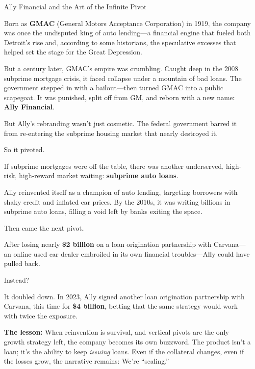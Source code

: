 \begin{HistoricalSidebar}{Ally Financial and the Art of the Infinite Pivot}

  Born as \textbf{GMAC} (General Motors Acceptance Corporation) in 1919, the company was once the undisputed king of 
  auto lending—a financial engine that fueled both Detroit’s rise and, according to some historians, the speculative 
  excesses that helped set the stage for the Great Depression.

  \medskip
  
  But a century later, GMAC’s empire was crumbling. Caught deep in the 2008 subprime mortgage crisis, it faced collapse 
  under a mountain of bad loans. The government stepped in with a bailout—then turned GMAC into a public scapegoat. 
  It was punished, split off from GM, and reborn with a new name: \textbf{Ally Financial}.
  
  \medskip
  
  But Ally’s rebranding wasn’t just cosmetic. The federal government barred it from re-entering the subprime housing 
  market that nearly destroyed it.

  \medskip
  
  So it pivoted.

  \medskip
  
  If subprime mortgages were off the table, there was another underserved, high-risk, high-reward market waiting: 
  \textbf{subprime auto loans}.
  
  \medskip
  
  Ally reinvented itself as a champion of auto lending, targeting borrowers with shaky credit and inflated car prices. 
  By the 2010s, it was writing billions in subprime auto loans, filling a void left by banks exiting the space.
  
  \medskip
  
  Then came the next pivot.

  \medskip
  
  After losing nearly \textbf{\$2 billion} on a loan origination partnership with Carvana—an online used car dealer 
  embroiled in its own financial troubles—Ally could have pulled back.

  \medskip
  
  Instead?

  \medskip
  
  It doubled down. In 2023, Ally signed another loan origination partnership with Carvana, this time for 
  \textbf{\$4 billion}, betting that the same strategy would work with twice the exposure.
  
  \medskip
  
  \textbf{The lesson:} When reinvention is survival, and vertical pivots are the only growth strategy left, the company 
  becomes its own buzzword. The product isn’t a loan; it’s the ability to keep \textit{issuing} loans. Even if the 
  collateral changes, even if the losses grow, the narrative remains: We’re “scaling.”
  
\end{HistoricalSidebar}

